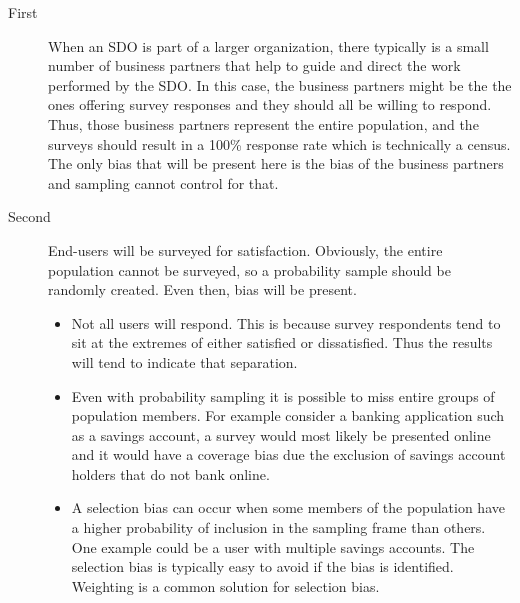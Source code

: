 \documentclass[SDSUThesis.tex]{subfiles}
\begin{document}
\begin{description}
\begin{description}
                    \item[First]
                    When an SDO is part of a larger organization, there typically is
                    a small number of business partners that help to guide and 
                    direct the work performed by the SDO.  In this case, the business 
                    partners might be the the ones offering survey responses and they 
                    should all be willing to respond.  Thus, those business partners 
                    represent the entire population, and the surveys should result in 
                    a 100\% response rate which is technically a census.  
                    The only bias that will be present here is the bias of the business 
                    partners and sampling cannot control for that.
           
                    \item[Second] End-users will be surveyed for satisfaction. Obviously, the 
                    entire population cannot be surveyed, so a probability sample should 
                    be randomly created. Even then, bias will be present.  
                        \begin{itemize}
                            \item Not all users will respond.  This is because survey 
                                respondents tend to sit at the extremes of either 
                                satisfied or dissatisfied.  Thus the results will tend 
                                to indicate that separation. 
                            \item  Even with probability sampling it is possible to miss 
                                entire groups of population members. For example consider a 
                                banking application such as a savings account, a survey would 
                                most likely be presented online and it would have a coverage 
                                bias due the exclusion of savings account holders that 
                                do not bank online.
                            \item A selection bias can occur when some members of the 
                                population have a higher probability of inclusion in 
                                the sampling frame than others.  One example could be 
                                a user with multiple savings accounts.  The selection 
                                bias is typically easy to avoid if the bias is 
                                identified.  Weighting is a common solution for selection bias. 
                        \end{itemize}
                       
                    \end{description}
                
                \end{description}
                
\end{document}
